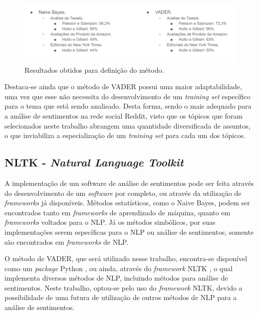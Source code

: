 \begin{figure}[htbp] 

 \begin{framed}\raggedleft%
 \centering 
\includegraphics[height=120px]{imagens/definicao.png}
\end{framed}
\caption{Resultados obtidos para definição do método.}
\label{fig:definicao}
\end{figure}

Destaca-se ainda que o método de \ac{VADER} possui uma maior
adaptabilidade, uma vez que esse não necessita do desenvolvimento de um
\textit{training set} específico para o tema que está sendo analisado.
Desta forma, sendo o mais adequado para a análise de sentimentos na rede social
Reddit, visto que os tópicos que foram selecionados neste trabalho abrangem uma
quantidade diversificada de assuntos, o que inviabiliza a especialização de um
\textit{training set} para cada um dos tópicos.


\subsection{NLTK - \textit{Natural Language Toolkit}}

A implementação de um software de análise de sentimentos pode ser feita através
do desenvolvimento de um \textit{software} por completo, ou através da
utilização de \textit{frameworks} já disponíveis.
Métodos estatísticos, como o Naive Bayes, podem ser encontrados tanto em
\textit{frameworks} de aprendizado de máquina, quanto em \textit{frameworks}
voltados para o \ac{NLP}.
Já os métodos simbólicos, por suas implementações serem específicas para o
\ac{NLP} ou análise de sentimentos, somente são encontrados em
\textit{frameworks} de \ac{NLP}.

O método de \ac{VADER}, que será utilizado nesse trabalho, encontra-se
disponível como um \textit{package} Python \cite{Rossum:1995:PRM:869369}, ou
ainda, através do \textit{framework} \ac{NLTK}
\cite{Loper:2002:NNL:1118108.1118117}, o qual implementa diversos métodos de
\ac{NLP}, incluindo métodos para análise de sentimentos. Neste trabalho,
optou-se pelo uso do \textit{framework} \ac{NLTK}, devido a possibilidade de uma
futura de utilização de outros métodos de \ac{NLP} para a análise de
sentimentos.

